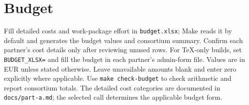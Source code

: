\clearpage
\section{Budget}
\begin{heguidance}
Fill detailed costs and work-package effort in \texttt{budget.xlsx}; Make reads
it by default and generates the budget values and consortium summary.
Confirm each partner's cost details only after reviewing unused rows.
For TeX-only builds, set \texttt{BUDGET\_XLSX=} and fill the budget in each
partner's admin-form file. Values are in EUR unless stated otherwise.
Leave unavailable amounts blank and enter zero explicitly where applicable.
Use \texttt{make check-budget} to check arithmetic and report consortium totals.
The detailed cost categories are documented in
\texttt{docs/part-a.md}; the selected call determines the applicable budget form.
\end{heguidance}
\HEPrintBudget
